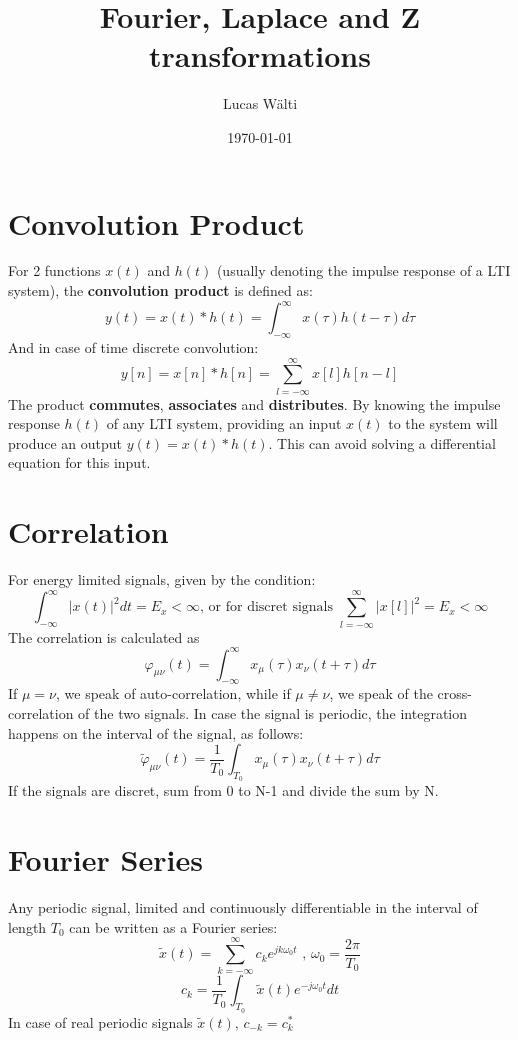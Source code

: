 \documentclass[10pt,a4paper]{article}
\title{Fourier, Laplace and Z transformations}
\author{Lucas Wälti}
\date{\today}
\begin{document}
\maketitle
\newpage
\tableofcontents
\thispagestyle{empty}	%

\newpage
\section{Convolution Product}
For 2 functions $x(t)$ and $h(t)$ (usually denoting the impulse response of a LTI system), the \textbf{convolution product} is defined as: 
$$
y(t) = x(t) * h(t) = \int_{-\infty}^{\infty}{x(\tau)h(t-\tau)} d\tau
$$
\noindent
And in case of time discrete convolution:
$$
y[n] = x[n] * h[n] = \sum_{l=-\infty}^{\infty}{x[l]h[n-l]}
$$
\noindent
The product \textbf{commutes}, \textbf{associates} and \textbf{distributes}. 
By knowing the impulse response $h(t)$ of any LTI system, providing an input $x(t)$ to the system will produce an output $y(t) = x(t) * h(t)$. This can avoid solving a differential equation for this input. 

\section{Correlation}
For energy limited signals, given by the condition:
$$
\int_{-\infty}^{\infty}{\vert x(t)\vert ^2 dt} = E_x < \infty \text{, or for discret signals } \sum_{l=-\infty}^{\infty}{\vert x[l]\vert ^2} = E_x < \infty
$$
\noindent
The correlation is calculated as
$$
\varphi_{\mu \nu}(t) = \int_{-\infty}^{\infty}{x_\mu(\tau)x_\nu(t+\tau)} d\tau
$$
\noindent
If $\mu = \nu$, we speak of auto-correlation, while if $\mu \neq \nu$, we speak of the cross-correlation of the two signals. In case the signal is periodic, the integration happens on the interval of the signal, as follows:
$$
\tilde{\varphi}_{\mu \nu}(t) = \frac{1}{T_0}\int_{T_0}{x_\mu(\tau)x_\nu(t+\tau)} d\tau
$$
\noindent 
If the signals are discret, sum from 0 to N-1 and divide the sum by N. 

\section{Fourier Series}
Any periodic signal, limited and continuously differentiable in the interval of length $T_0$ can be written as a Fourier series: 
$$
\boxed{
\tilde{x}(t) = \sum_{k=-\infty}^{\infty}{c_ke^{j k \omega_0 t}}
} \text{ , } 
\omega_0 = \frac{2 \pi}{T_0}
$$
$$
\boxed{
c_k = \frac{1}{T_0} \int_{T_0}{\tilde{x}(t) e^{-j \omega_0 t} dt}
}
$$
\noindent
In case of real periodic signals $\tilde{x}(t)$, $\boxed{ c_{-k} = c_k^* }$
\end{document}
